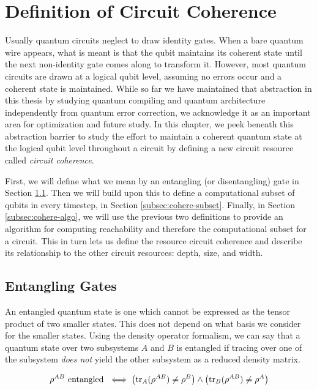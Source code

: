 \section{Definition of Circuit Coherence}
\label{sec:cohere-def}

Usually quantum circuits neglect to draw identity gates. When a bare
quantum wire appears, what is meant is that the qubit maintains its
coherent state until the next non-identity gate comes along to transform it.
However, most quantum circuits are drawn at a logical qubit level,
assuming no errors occur and a coherent state is maintained. While
so far we have maintained that abstraction in this thesis by studying
quantum compiling and quantum architecture independently from
quantum error correction, we acknowledge it as an important area for
optimization and future study. In this chapter, we peek beneath
this abstraction barrier to study
the effort to maintain a coherent quantum state at the logical qubit level
throughout a circuit
by defining a new circuit resource called \emph{circuit coherence}.

First, we will define what we mean by an entangling (or disentangling) gate
in Section \ref{subsec:cohere-entangle}. Then we will build upon this
to define a computational subset of qubits in every
timestep, in Section \ref{subsec:cohere-subset}. Finally,
in Section \ref{subsec:cohere-algo}, we will use
the previous two definitions to provide an algorithm for
computing reachability and therefore the computational subset for a circuit.
This in turn lets us define the resource circuit coherence and
describe its relationship to the other circuit resources: depth, size, and
width. 

\subsection{Entangling Gates}
\label{subsec:cohere-entangle}

An entangled quantum state is one which cannot be expressed as the
tensor product of two smaller states. This does not depend on what basis
we consider for the smaller states. Using the density operator formalism,
we can say that a quantum state over two subsystems $A$ and $B$ is
entangled if tracing over one of the subsystem \emph{does not} yield the other subsystem
as a reduced density matrix.

\begin{equation}
\rho^{AB} \text{ entangled }
\iff \left( \text{tr}_{A}(\rho^{AB}) \ne \rho^{B} \right) \land
\left(\text{tr}_{B}(\rho^{AB}) \ne \rho^{A} \right)
\end{equation}

